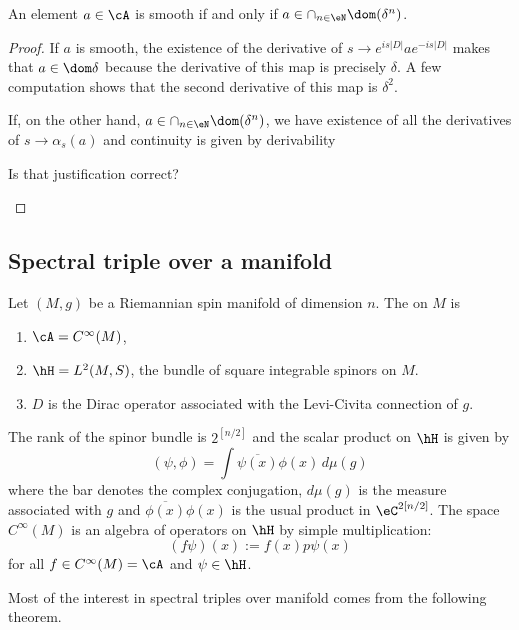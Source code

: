 \begin{proposition}
An element $a\in\cA$ is smooth if and only if $a\in\cap_{n\in\eN}\dom(\delta^n)$.
\end{proposition}

\begin{proof}
If $a$ is smooth, the existence of the derivative of $s\to  e^{is| D |}a e^{-is| D |}$ makes that $a\in\dom\delta$ because the derivative of this map is precisely $\delta$. A few computation shows that the second derivative of this map is $\delta^2$.

If, on the other hand, $a\in\cap_{n\in\eN}\dom(\delta^n)$, we have existence of all the derivatives of $s\to\alpha_s(a)$ and continuity is given by derivability
\begin{probleme}
	Is that justification correct?
\end{probleme}

\end{proof}

\subsection{Spectral triple over a manifold}

Let $(M,g)$ be a Riemannian spin manifold of dimension $n$. The  on $M$ is 
\begin{enumerate}
\item $\cA= C^{\infty}(M)$,
\item $\hH=L^2(M,S)$, the bundle of square integrable spinors on $M$.
\item $D$ is the Dirac operator associated with the Levi-Civita connection of $g$.
\end{enumerate}
The rank of the spinor bundle is $2^{[n/2]}$ and the scalar product on $\hH$ is given by
\[ 
  (\psi,\phi)=\int \overline{ \psi(x) }\phi(x)\,d\mu(g)
\]
where the bar denotes the complex conjugation, $d\mu(g)$ is the measure associated with $g$ and $\overline{ \phi(x) }\phi(x)$ is the usual product in $\eC^{2[n/2]}$. The space $ C^{\infty}(M)$ is an algebra of operators on $\hH$ by simple multiplication:
\begin{equation}
(f\psi)(x):=f(x)p\psi(x)
\end{equation}
for all $f\in C^{\infty}(M)=\cA$ and $\psi\in\hH$.

Most of the interest in spectral triples over manifold comes from the following theorem.

